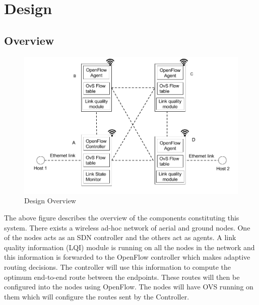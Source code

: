 \documentclass{article}
\begin{document}
\section{Design}
\subsection{Overview}
\begin{figure}[H]
\caption{Design Overview}
\centering
\includegraphics[width=\textwidth]{design}
\end{figure}
The above figure describes the overview of the components constituting this system. There exists a wireless ad-hoc
network of aerial and ground nodes. One of the nodes acts as an SDN controller and the others act as agents. A link
quality information (LQI) module is running on all the nodes in the network and this information is forwarded to the
OpenFlow controller which makes adaptive routing decisions. The controller will use this information to compute the
optimum end-to-end route between the endpoints. These routes will then be configured into the nodes using OpenFlow. The
nodes will have OVS running on them which will configure the routes sent by the Controller. 
\end{document}
